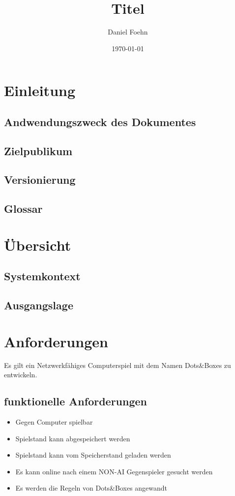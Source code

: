 \documentclass[a4paper, 10pt, fleqn]{article}
\title{Titel}
\author{Daniel Foehn}
\date{\today} %
\begin{document}
	\maketitle
	\tableofcontents
	\listoffigures
	\listoftables
	
	\section{Einleitung}
		\subsection{Andwendungszweck des Dokumentes}
		
		\subsection{Zielpublikum}
		
		\subsection{Versionierung}
		
		\subsection{Glossar}
	
	\clearpage
	\section{Übersicht}
	    \subsection{Systemkontext}
		
		\subsection{Ausgangslage}
		
	\clearpage
	\section{Anforderungen}
		Es gilt ein Netzwerkfähiges Computerspiel mit dem Namen Dots\&Boxes zu entwickeln.
		\subsection{funktionelle Anforderungen}
			\begin{itemize}
				\item Gegen Computer spielbar
				\item Spielstand kann abgespeichert werden
				\item Spielstand kann vom Speicherstand geladen werden
				\item Es kann online nach einem NON-AI Gegenspieler gesucht werden
				\item Es werden die Regeln von Dots\&Boxes angewandt
			\end{itemize}
\end{document}
